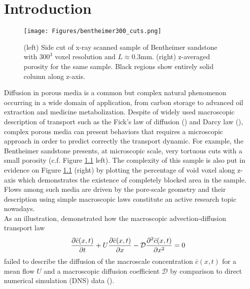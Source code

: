 \chapter{Introduction}
\begin{figure}
	\centering
	\texttt{[image: Figures/bentheimer300\_cuts.png]}
	\caption{(left) Side cut of x-ray scanned sample of Bentheimer sandstone with $300^3$ voxel resolution and $L\approx0.3$mm. (right) z-averaged porosity for the same sample. Black regions show entirely solid column along z-axis.}
	\label{fig:bentheimer300cuts}
\end{figure}
Diffusion in porous media is a common but complex natural phenomenon occurring in a wide domain of application, from carbon storage to advanced oil extraction and medicine metabolization.
Despite of widely used macroscopic description of transport such as the Fick's law of diffusion (\citet{Fick1855}) and Darcy law (\citet{Darcy1856}), complex porous media can present behaviors that requires a microscopic approach in order to predict correctly the transport dynamic.
For example, the Bentheimer sandstone presents, at microscopic scale, very tortuous cuts with a small porosity (c.f. Figure \ref{fig:bentheimer300cuts} left).
The complexity of this sample is also put in evidence on Figure \ref{fig:bentheimer300cuts} (right) by plotting the percentage of void voxel along z-axis which demonstrates the existence of completely blocked area in the sample.
Flows among such media are driven by the pore-scale geometry and their description using simple macroscopic laws constitute an active research topic nowadays.\\
As an illustration, \citet{Dentz2017} demonstrated how the macroscopic advection-diffusion transport law
\begin{equation}
	\pdv{\bar{c}(x,t)}{t}+U\pdv{\bar{c}(x,t)}{x}-\mathcal{D}\pdv[2]{\bar{c}(x,t)}{x}=0
\label{eq:adv_diff}
\end{equation}
failed to describe the diffusion of the macroscale concentration $\bar{c}(x,t)$ for a mean flow $U$ and a macroscopic diffusion coefficient $\mathcal{D}$ by comparison to direct numerical simulation (DNS) data (\citet[Fig. 3]{Dentz2017}).\\


